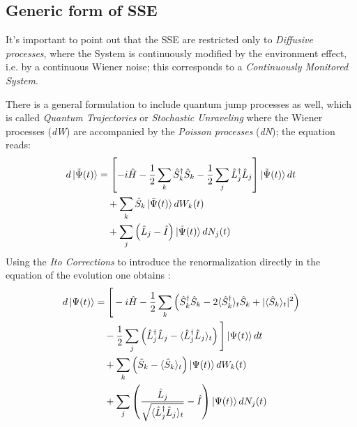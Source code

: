\documentclass[a4paper,12pt]{article}
\begin{document}
	\subsection{Generic form of SSE}
	\label{sub:generic_form_of_SSE}
	
	It's important to point out that the SSE are restricted only to \textit{Diffusive processes}, where the System is continuously modified by the environment effect, i.e. by a continuous Wiener noise; this corresponds to a \textit{Continuously Monitored System}.
	
	There is a general formulation to include quantum jump processes as well, which is called \textit{Quantum Trajectories} or \textit{Stochastic Unraveling} where the Wiener processes (\textit{dW}) are accompanied by the \textit{Poisson processes} (\textit{dN}); the equation reads:
	\begin{equation}
		\begin{aligned}
			d\ket{\tilde{\Psi}(t)} &= \left[ -i \hat{H} 
			- \frac{1}{2} \sum_{k} \hat{S}_{k}^{\dagger} \hat{S}_{k} 
			- \frac{1}{2} \sum_{j} \hat{L}_{j}^{\dagger} \hat{L}_{j} \right] \ket{\tilde{\Psi}(t)} dt \\
			&\quad + \sum_{k} \hat{S}_{k} \ket{\tilde{\Psi}(t)} dW_{k}(t) \\
			&\quad + \sum_{j} \left( \hat{L}_{j} - \hat{I} \right) \ket{\tilde{\Psi}(t)} dN_{j}(t)
		\end{aligned}
	\end{equation}	
	Using the \textit{Ito Corrections} to introduce the renormalization directly in the equation of the evolution one obtains : 
	\begin{equation}
		\begin{aligned}
			d\ket{\Psi(t)} &= \Bigg[ -i \hat{H} 
			- \frac{1}{2} \sum_{k} \left( \hat{S}_{k}^{\dagger} \hat{S}_{k} - 2\langle \hat{S}_{k}^{\dagger} \rangle_{t} \hat{S}_{k} + |\langle \hat{S}_{k} \rangle_{t}|^{2} \right) \\
			&\quad - \frac{1}{2} \sum_{j} \left( \hat{L}_{j}^{\dagger} \hat{L}_{j} - \langle \hat{L}_{j}^{\dagger} \hat{L}_{j} \rangle_{t} \right) \Bigg] \ket{\Psi(t)} dt \\
			&\quad + \sum_{k} \left( \hat{S}_{k} - \langle \hat{S}_{k} \rangle_{t} \right) \ket{\Psi(t)} dW_{k}(t) \\
			&\quad + \sum_{j} \left( \frac{\hat{L}_{j}}{\sqrt{\langle \hat{L}_{j}^{\dagger} \hat{L}_{j} \rangle_{t}}} - \hat{I} \right) \ket{\Psi(t)} dN_{j}(t)
		\end{aligned}
	\end{equation}
	
\end{document}

